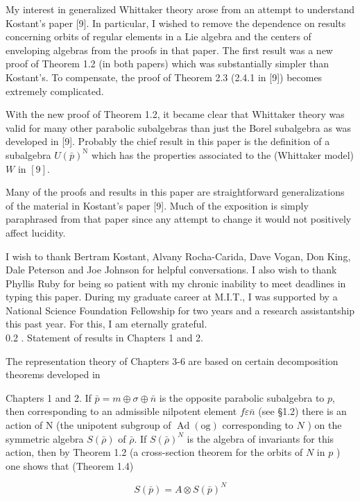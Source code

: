 \documentclass[10pt]{article}
\begin{document}
My interest in generalized Whittaker theory arose from an attempt to understand Kostant's paper [9]. In particular, I wished to remove the dependence on results concerning orbits of regular elements in a Lie algebra and the centers of enveloping algebras from the proofs in that paper. The first result was a new proof of Theorem 1.2 (in both papers) which was substantially simpler than Kostant's. To compensate, the proof of Theorem 2.3 (2.4.1 in [9]) becomes extremely complicated.

With the new proof of Theorem 1.2, it became clear that Whittaker theory was valid for many other parabolic subalgebras than just the Borel subalgebra as was developed in [9]. Probably the chief result in this paper is the definition of a subalgebra $U(\bar{p})^{\mathrm{N}}$ which has the properties associated to the (Whittaker model) $W$ in $[9]$.

Many of the proofs and results in this paper are straightforward generalizations of the material in Kostant's paper [9]. Much of the exposition is simply paraphrased from that paper since any attempt to change it would not positively affect lucidity.

I wish to thank Bertram Kostant, Alvany Rocha-Carida, Dave Vogan, Don King, Dale Peterson and Joe Johnson for helpful conversations. I also wish to thank Phyllis Ruby for being so patient with my chronic inability to meet deadlines in typing this paper. During my graduate career at M.I.T., I was supported by a National Science Foundation Fellowship for two years and a research assistantship this past year. For this, I am eternally grateful.\\
0.2 . Statement of results in Chapters 1 and 2.

The representation theory of Chapters 3-6 are based on certain decomposition theorems developed in

Chapters 1 and 2. If $\bar{p}=m \oplus \sigma \oplus \bar{n}$ is the opposite parabolic subalgebra to $p$, then corresponding to an admissible nilpotent element $f \varepsilon \bar{n}$ (see §1.2) there is an action of N (the unipotent subgroup of $\operatorname{Ad}(\mathrm{og})$ corresponding to $N$ ) on the symmetric algebra $S(\bar{\rho})$ of $\bar{\rho}$. If $S(\bar{\rho})^{N}$ is the algebra of invariants for this action, then by Theorem 1.2 (a cross-section theorem for the orbits of $N$ in $p$ ) one shows that (Theorem 1.4)


\begin{equation*}
S(\bar{p})=A \otimes S(\bar{p})^{N} \tag{0.2.1}
\end{equation*}
\end{document}
